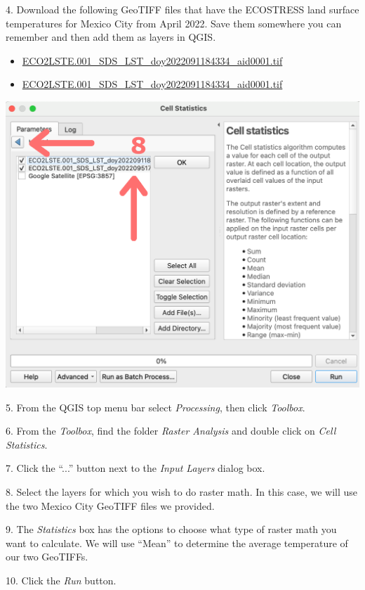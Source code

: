 \documentclass[oneside,a4paper,11pt,explicit]{book}
\begin{document}
4. Download the following GeoTIFF files that have the ECOSTRESS land surface temperatures for Mexico City from April 2022. Save them somewhere you can remember and then add them as layers in QGIS. 

\begin{itemize}
    \item \href{https://jeremydforsythe.github.io/icecream-tutorials/Tutorial11_RasterCalculator/ECO2LSTE.001_SDS_LST_doy2022091184334_aid0001.tif}{\small ECO2LSTE.001\_SDS\_LST\_doy2022091184334\_aid0001.tif}
    \item \href{https://jeremydforsythe.github.io/icecream-tutorials/Tutorial11_RasterCalculator/ECO2LSTE.001_SDS_LST_doy2022091184334_aid0001.tif}{\small ECO2LSTE.001\_SDS\_LST\_doy2022091184334\_aid0001.tif}
\end{itemize}

\vspace{.5em}

\centerline{\includegraphics[width=.45\textwidth]{CellSelect.png}}

\vspace{.5em}

5. From the QGIS top menu bar select \textit{Processing}, then click \textit{Toolbox}.

6. From the \textit{Toolbox}, find the folder \textit{Raster Analysis} and double click on \textit{Cell Statistics}.

7. Click the ``...'' button next to the \textit{Input Layers} dialog box. 

8. Select the layers for which you wish to do raster math. In this case, we will use the two Mexico City GeoTIFF files we provided.

9. The \textit{Statistics} box has the options to choose what type of raster math you want to calculate. We will use ``Mean'' to determine the average temperature of our two GeoTIFFs. 

10. Click the \textit{Run} button.

\vspace{.5em}
\end{document}
